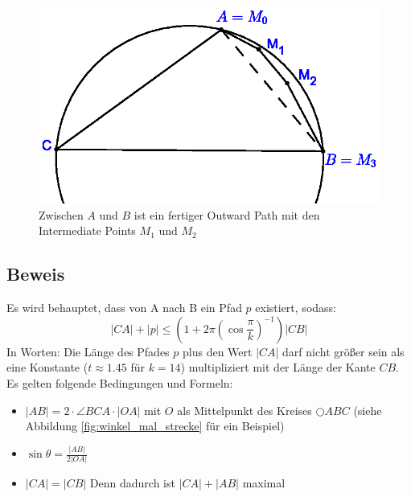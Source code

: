 \documentclass[a4paper,twoside]{IEEEtran}
\begin{document}
\begin{figure}[h!]
\centering
\includegraphics[width=1\linewidth]{outward_path_fertig.eps}
\caption{Zwischen $A $ und $B $ ist ein fertiger Outward Path mit den Intermediate Points $M_1 $ und $M_2 $}
\label{fig:outward_path_fertig}
\end{figure}

\subsection{Beweis}
Es wird behauptet, dass von A nach B ein Pfad $p $ existiert, sodass:
\begin{equation}
|CA| + |p| \leq (1+2\pi(\cos{\frac{\pi}{k}})^{-1})|CB|
\end{equation} \label{SpannerFormel}
In Worten: Die Länge des Pfades $p $ plus den Wert $|CA| $ darf nicht größer sein als eine Konstante ($t \approx 1.45 $ für $k=14 $) multipliziert mit der Länge der Kante $CB $.
Es gelten folgende Bedingungen und Formeln:
\begin{itemize}
\item $|AB| = 2\cdot \angle{BCA} \cdot |OA| $ mit $O $ als Mittelpunkt des Kreises $\bigcirc{ABC} $ (siehe Abbildung \ref{fig:winkel_mal_strecke} für ein Beispiel)
\item $\sin{\theta}=\frac{|AB|}{2|OA|} $ %
\item $|CA|=|CB| $ Denn dadurch ist $|CA| + |AB| $ maximal%
\end{itemize}
\end{document}
